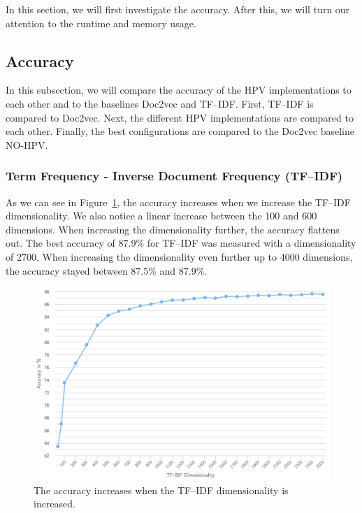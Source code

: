 In this section, we will first investigate the accuracy. After this, we will turn our attention to the runtime and memory usage.

\subsection{Accuracy}\label{5:accuracy}

In this subsection, we will compare the accuracy of the HPV implementations to each other and to the baselines Doc2vec and TF--IDF\@. First, TF--IDF is compared to Doc2vec. Next, the different HPV implementations are compared to each other. Finally, the best configurations are compared to the Doc2vec baseline NO-HPV\@.

\subsubsection{Term Frequency - Inverse Document Frequency (TF--IDF)}

As we can see in Figure~\ref{fig:5:results-tfidf}, the accuracy increases when we increase the TF--IDF dimensionality. We also notice a linear increase between the 100 and 600 dimensions. When increasing the dimensionality further, the accuracy flattens out. The best accuracy of 87.9\% for TF--IDF was measured with a dimensionality of 2700. When increasing the dimensionality even further up to 4000 dimensions, the accuracy stayed between 87.5\% and 87.9\%.

\begin{figure}
	\centering
	\includegraphics[width=1.0\textwidth]{5experiments/results-tfidf}
	\caption{The accuracy increases when the TF--IDF dimensionality is increased. }
	\label{fig:5:results-tfidf}
\end{figure}

